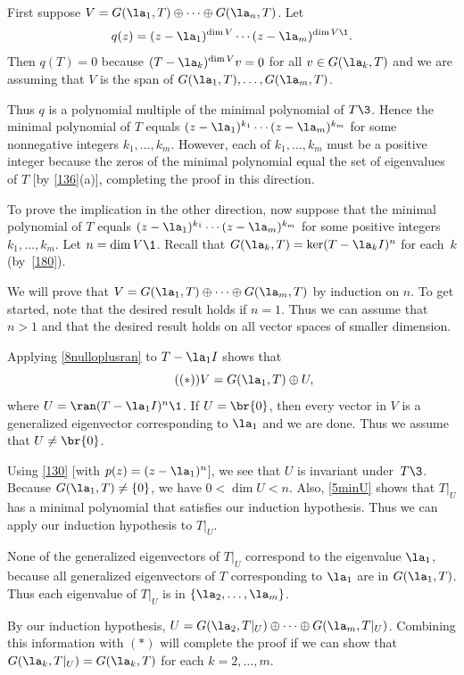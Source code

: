 \begin{Solution}
First suppose $V = G(\la_1, T) \oplus \cdots \oplus G(\la_n, T)$. Let
\[
q(z) = (z-\la_1)^{\dim V} \cdots (z - \la_m)^{\dim V\1}.
\]
Then $q(T) = 0$ because $(T - \la_k)^{\dim V} v = 0$ for all $v \in G(\la_k, T)$ and we are assuming that
$V$ is the span of $G(\la_1, T), \ldots, G(\la_m, T)$.

Thus $q$ is a polynomial multiple of the minimal polynomial of $T\3$. Hence the minimal polynomial of $T$ equals
$(z-\la_1)^{k_1} \cdots (z - \la_m)^{k_m}$ for some nonnegative integers $k_1, \ldots, k_m$. However, each of $k_1, \ldots, k_m$ must be a positive integer because the zeros of the minimal polynomial equal the set of eigenvalues of $T$ [by \ref{136}(a)], completing the proof in this direction.

To prove the implication in the other direction, now suppose that the minimal polynomial of $T$ equals
$(z-\la_1)^{k_1} \cdots (z - \la_m)^{k_m}$ for some positive integers $k_1, \ldots, k_m$. Let $n = \dim V\1$. Recall that $G(\la_k, T) = \ker (T - \la_k I)^n$ for each~$k$ (by~\ref{180}).

We will prove that $V = G(\la_1, T) \oplus \cdots \oplus G(\la_m, T)$ by induction on $n$. To get started, note that the desired result holds if $n = 1$. Thus we can assume that $n > 1$ and that the desired result holds on all vector spaces of smaller dimension.

Applying \ref{8nulloplusran} to
$T - \la_1 I$ shows that
\[ \tag{$(*)$}
V = G(\la_1, T) \oplus U,
\]
where $U = \ran(T - \la_1 I)^n\1$. If $U = \br{0}$, then every vector in $V$ is a generalized eigenvector corresponding to $\la_1$ and we are done. Thus we assume that $U \ne \br{0}$.

Using \ref{130} [with $p(z) = (z - \la_1)^n$], we see that $U$ is invariant under~$T\3$. Because $G(\la_1, T) \ne \{0\}$, we have
$0 < \dim U < n$. Also, \ref{5minU} shows that $T|_U$ has a minimal polynomial that satisfies our induction hypothesis. Thus we can apply our induction hypothesis to $T|_U$.

None of the generalized eigenvectors of $T|_U$ correspond to the eigenvalue $\la_1$, because all generalized eigenvectors of $T$  corresponding to $\la_1$ are in $G(\la_1, T)$. Thus each eigenvalue of $T|_U$ is in $\{\la_2, \dots, \la_m\}$.

By our induction hypothesis, $U = G(\la_2, T|_U) \oplus \dots \oplus G(\la_m, T|_U)$. Combining this information with $(*)$ will complete the proof if we can show that $G(\la_k, T|_U) = G(\la_k, T)$ for each $k = 2, \dots, m$.


\end{Solution}
